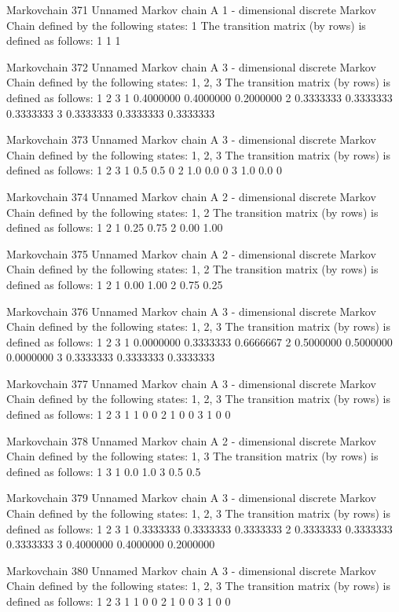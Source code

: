 \documentclass[
  nojss]{jss}
\begin{document}
\begin{CodeChunk}
\begin{CodeOutput}
Markovchain  371 
Unnamed Markov chain 
 A  1 - dimensional discrete Markov Chain defined by the following states: 
 1 
 The transition matrix  (by rows)  is defined as follows: 
  1
1 1

Markovchain  372 
Unnamed Markov chain 
 A  3 - dimensional discrete Markov Chain defined by the following states: 
 1, 2, 3 
 The transition matrix  (by rows)  is defined as follows: 
          1         2         3
1 0.4000000 0.4000000 0.2000000
2 0.3333333 0.3333333 0.3333333
3 0.3333333 0.3333333 0.3333333

Markovchain  373 
Unnamed Markov chain 
 A  3 - dimensional discrete Markov Chain defined by the following states: 
 1, 2, 3 
 The transition matrix  (by rows)  is defined as follows: 
    1   2 3
1 0.5 0.5 0
2 1.0 0.0 0
3 1.0 0.0 0

Markovchain  374 
Unnamed Markov chain 
 A  2 - dimensional discrete Markov Chain defined by the following states: 
 1, 2 
 The transition matrix  (by rows)  is defined as follows: 
     1    2
1 0.25 0.75
2 0.00 1.00

Markovchain  375 
Unnamed Markov chain 
 A  2 - dimensional discrete Markov Chain defined by the following states: 
 1, 2 
 The transition matrix  (by rows)  is defined as follows: 
     1    2
1 0.00 1.00
2 0.75 0.25

Markovchain  376 
Unnamed Markov chain 
 A  3 - dimensional discrete Markov Chain defined by the following states: 
 1, 2, 3 
 The transition matrix  (by rows)  is defined as follows: 
          1         2         3
1 0.0000000 0.3333333 0.6666667
2 0.5000000 0.5000000 0.0000000
3 0.3333333 0.3333333 0.3333333

Markovchain  377 
Unnamed Markov chain 
 A  3 - dimensional discrete Markov Chain defined by the following states: 
 1, 2, 3 
 The transition matrix  (by rows)  is defined as follows: 
  1 2 3
1 1 0 0
2 1 0 0
3 1 0 0

Markovchain  378 
Unnamed Markov chain 
 A  2 - dimensional discrete Markov Chain defined by the following states: 
 1, 3 
 The transition matrix  (by rows)  is defined as follows: 
    1   3
1 0.0 1.0
3 0.5 0.5

Markovchain  379 
Unnamed Markov chain 
 A  3 - dimensional discrete Markov Chain defined by the following states: 
 1, 2, 3 
 The transition matrix  (by rows)  is defined as follows: 
          1         2         3
1 0.3333333 0.3333333 0.3333333
2 0.3333333 0.3333333 0.3333333
3 0.4000000 0.4000000 0.2000000

Markovchain  380 
Unnamed Markov chain 
 A  3 - dimensional discrete Markov Chain defined by the following states: 
 1, 2, 3 
 The transition matrix  (by rows)  is defined as follows: 
  1 2 3
1 1 0 0
2 1 0 0
3 1 0 0


\end{CodeOutput}
\end{CodeChunk}
\end{document}
